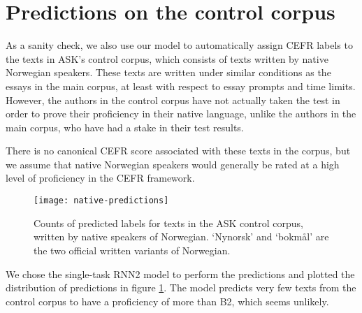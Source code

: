 \section{Predictions on the control corpus}

As a sanity check, we also use our model to automatically assign CEFR labels
to the texts in ASK's control corpus, which consists of texts written by
native Norwegian speakers. These texts are written under similar conditions as
the essays in the main corpus, at least with respect to essay prompts and time
limits. However, the authors in the control corpus have not actually taken the
test in order to prove their proficiency in their native language, unlike the
authors in the main corpus, who have had a stake in their test results.

There is no canonical CEFR score associated with
these texts in the corpus, but we assume that native Norwegian speakers would
generally be rated at a high level of proficiency in the CEFR framework.

\begin{figure}
  \centering
  \texttt{[image: native-predictions]}
  \caption[Predicted CEFR score for native Norwegian speakers]{
    Counts of predicted labels for texts in the ASK control corpus, written by
    native speakers of Norwegian. `Nynorsk' and `bokmål' are the two official
    written variants of Norwegian.
  }
  \label{native-predictions}
\end{figure}

We chose the single-task RNN2 model to perform the predictions and plotted the
distribution of predictions in figure \ref{native-predictions}. The model predicts
very few texts from the control corpus to have a proficiency of more than B2,
which seems unlikely.
